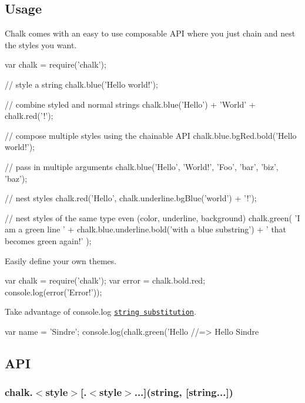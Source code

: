 

\subsection*{Usage}

Chalk comes with an easy to use composable A\+PI where you just chain and nest the styles you want.


\begin{DoxyCode}
var chalk = require('chalk');

// style a string
chalk.blue('Hello world!');

// combine styled and normal strings
chalk.blue('Hello') + 'World' + chalk.red('!');

// compose multiple styles using the chainable API
chalk.blue.bgRed.bold('Hello world!');

// pass in multiple arguments
chalk.blue('Hello', 'World!', 'Foo', 'bar', 'biz', 'baz');

// nest styles
chalk.red('Hello', chalk.underline.bgBlue('world') + '!');

// nest styles of the same type even (color, underline, background)
chalk.green(
  'I am a green line ' +
  chalk.blue.underline.bold('with a blue substring') +
  ' that becomes green again!'
);
\end{DoxyCode}


Easily define your own themes.


\begin{DoxyCode}
var chalk = require('chalk');
var error = chalk.bold.red;
console.log(error('Error!'));
\end{DoxyCode}


Take advantage of console.\+log \href{http://nodejs.org/docs/latest/api/console.html#console_console_log_data}{\tt string substitution}.


\begin{DoxyCode}
var name = 'Sindre';
console.log(chalk.green('Hello %
//=> Hello Sindre
\end{DoxyCode}


\subsection*{A\+PI}

\subsubsection*{chalk.{\ttfamily $<$style$>$\mbox{[}.$<$style$>$...\mbox{]}(string, \mbox{[}string...\mbox{]})}}


